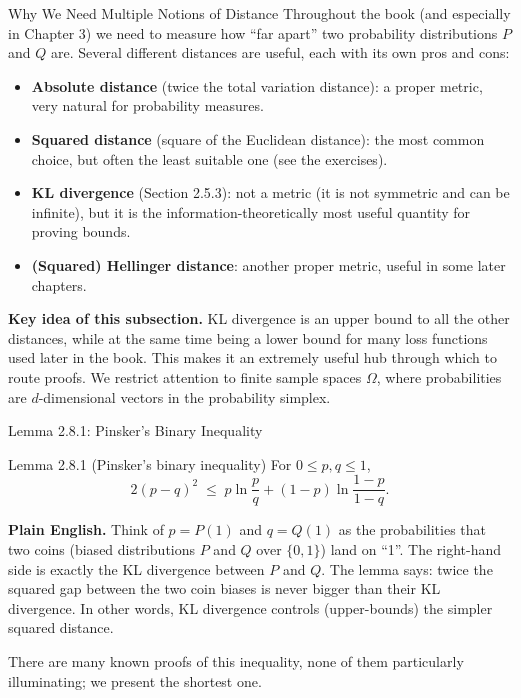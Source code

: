 \documentclass[aspectratio=169,10pt]{beamer}
\begin{document}
\begin{frame}{Why We Need Multiple Notions of Distance}
  Throughout the book (and especially in Chapter 3) we need to measure how
  ``far apart'' two probability distributions $P$ and $Q$ are. Several
  different distances are useful, each with its own pros and cons:

  \begin{itemize}
    \item \textbf{Absolute distance} (twice the total variation distance):
      a proper metric, very natural for probability measures.
    \item \textbf{Squared distance} (square of the Euclidean distance): the
      most common choice, but often the least suitable one (see the
      exercises).
    \item \textbf{KL divergence} (Section 2.5.3): not a metric (it is not
      symmetric and can be infinite), but it is the
      information-theoretically most useful quantity for proving bounds.
    \item \textbf{(Squared) Hellinger distance}: another proper metric,
      useful in some later chapters.
  \end{itemize}

  \textbf{Key idea of this subsection.} KL divergence is an upper bound to
  all the other distances, while at the same time being a lower bound for
  many loss functions used later in the book. This makes it an extremely
  useful hub through which to route proofs. We restrict attention to finite
  sample spaces $\Omega$, where probabilities are $d$-dimensional vectors in
  the probability simplex.
\end{frame}

\begin{frame}{Lemma 2.8.1: Pinsker's Binary Inequality}
  \begin{block}{Lemma 2.8.1 (Pinsker's binary inequality)}
    For $0 \le p, q \le 1$,
    \[
      2(p-q)^2 \;\le\; p\ln\frac{p}{q} + (1-p)\ln\frac{1-p}{1-q}.
    \]
  \end{block}

  \textbf{Plain English.} Think of $p = P(1)$ and $q = Q(1)$ as the
  probabilities that two coins (biased distributions $P$ and $Q$ over
  $\{0,1\}$) land on ``1''. The right-hand side is exactly the KL divergence
  between $P$ and $Q$. The lemma says: twice the squared gap between the two
  coin biases is never bigger than their KL divergence. In other words, KL
  divergence controls (upper-bounds) the simpler squared distance.

  \vspace{2mm}
  There are many known proofs of this inequality, none of them particularly
  illuminating; we present the shortest one.
\end{frame}
\end{document}
